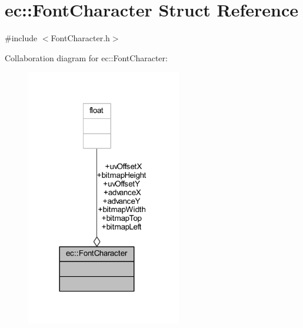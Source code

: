 \hypertarget{structec_1_1_font_character}{}\section{ec\+:\+:Font\+Character Struct Reference}
\label{structec_1_1_font_character}


{\ttfamily \#include $<$Font\+Character.\+h$>$}



Collaboration diagram for ec\+:\+:Font\+Character\+:\nopagebreak
\begin{figure}[H]
\begin{center}
\leavevmode
\includegraphics[width=192pt]{structec_1_1_font_character__coll__graph}
\end{center}
\end{figure}
